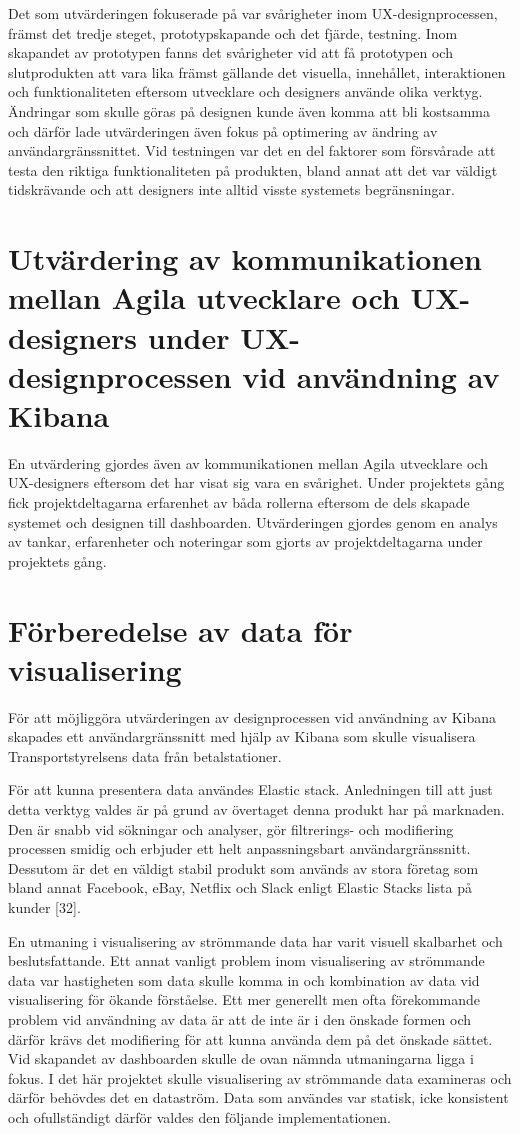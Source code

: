 \documentclass{kththesis}
\begin{document}
Det som utvärderingen fokuserade på var svårigheter inom UX-designprocessen, främst det tredje steget, prototypskapande och det fjärde, testning. Inom skapandet av prototypen fanns det svårigheter vid att få prototypen och slutprodukten att vara lika främst gällande det visuella, innehållet, interaktionen och funktionaliteten eftersom utvecklare och designers använde olika verktyg. Ändringar som skulle göras på designen kunde även komma att bli kostsamma och därför lade utvärderingen även fokus på optimering av ändring av användargränssnittet. Vid testningen var det en del faktorer som försvårade att testa den riktiga funktionaliteten på produkten, bland annat att det var väldigt tidskrävande och att designers inte alltid visste systemets begränsningar. 

\section{Utvärdering av kommunikationen mellan Agila utvecklare och UX-designers under UX-designprocessen vid användning av Kibana}

En utvärdering gjordes även av kommunikationen mellan Agila utvecklare och UX-designers eftersom det har visat sig vara en svårighet. Under projektets gång fick projektdeltagarna erfarenhet av båda rollerna eftersom de dels skapade systemet och designen till dashboarden. Utvärderingen gjordes genom en analys av tankar, erfarenheter och noteringar som gjorts av projektdeltagarna under projektets gång. 


\section{Förberedelse av data för visualisering}

För att möjliggöra utvärderingen av designprocessen vid användning av Kibana skapades ett användargränssnitt med hjälp av Kibana som skulle visualisera Transportstyrelsens data från betalstationer.

För att kunna presentera data användes Elastic stack. Anledningen till att just detta verktyg valdes är på grund av övertaget denna produkt har på marknaden. Den är snabb vid sökningar och analyser, gör filtrerings- och modifiering processen smidig och erbjuder ett helt anpassningsbart användargränssnitt. Dessutom är det en väldigt stabil produkt som används av stora företag som bland annat Facebook, eBay, Netflix och Slack enligt Elastic Stacks lista på kunder [32]. 

En utmaning i visualisering av strömmande data har varit visuell skalbarhet och beslutsfattande. Ett annat vanligt problem inom visualisering av strömmande data var hastigheten som data skulle komma in och kombination av data vid visualisering för ökande förståelse.  Ett mer generellt men ofta förekommande problem vid användning av data är att de inte är i den önskade formen och därför krävs det modifiering för att kunna använda dem på det önskade sättet. Vid skapandet av dashboarden skulle de ovan nämnda utmaningarna ligga i fokus. I det här projektet skulle visualisering av strömmande data examineras och därför behövdes det en dataström. Data som användes var statisk, icke konsistent och ofullständigt därför valdes den följande implementationen.
\end{document}
